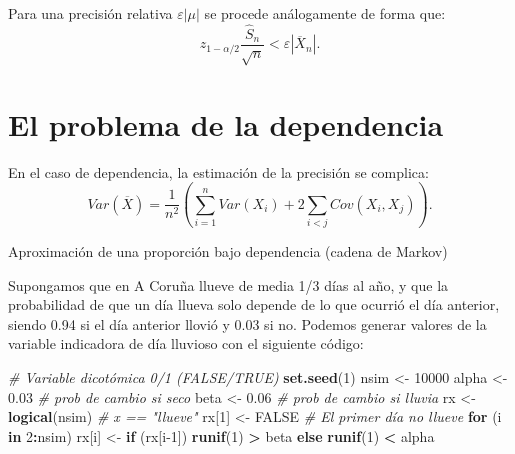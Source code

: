 \documentclass[
]{book}
\newenvironment{Shaded}{\begin{snugshade}}{\end{snugshade}}
\newcommand{\CommentTok}[1]{\textcolor[rgb]{0.56,0.35,0.01}{\textit{#1}}}
\newcommand{\ControlFlowTok}[1]{\textcolor[rgb]{0.13,0.29,0.53}{\textbf{#1}}}
\newcommand{\DecValTok}[1]{\textcolor[rgb]{0.00,0.00,0.81}{#1}}
\newcommand{\FloatTok}[1]{\textcolor[rgb]{0.00,0.00,0.81}{#1}}
\newcommand{\KeywordTok}[1]{\textcolor[rgb]{0.13,0.29,0.53}{\textbf{#1}}}
\newcommand{\NormalTok}[1]{#1}
\newcommand{\OperatorTok}[1]{\textcolor[rgb]{0.81,0.36,0.00}{\textbf{#1}}}
\newcommand{\OtherTok}[1]{\textcolor[rgb]{0.56,0.35,0.01}{#1}}
\newcommand{\StringTok}[1]{\textcolor[rgb]{0.31,0.60,0.02}{#1}}
\theoremstyle{break}
\theoremstyle{definition}
\theoremstyle{definition}
\theoremstyle{definition}
\theoremstyle{remark}
\let\BeginKnitrBlock\begin \let\EndKnitrBlock\end
\begin{document}
Para una precisión relativa \(\varepsilon \left\vert \mu \right\vert\) se procede análogamente de forma que:
\[z_{1-\alpha /2}\dfrac{\widehat{S}_{n}}{\sqrt{n}}<\varepsilon \left\vert 
\overline{X}_{n}\right\vert .\]

\hypertarget{el-problema-de-la-dependencia}{%
\section{El problema de la dependencia}\label{el-problema-de-la-dependencia}}

En el caso de dependencia, la estimación de la precisión se complica:
\[Var\left( \overline{X}\right) =\frac{1}{n^{2}}\left( 
\sum_{i=1}^{n}Var\left( X_{i} \right) + 2\sum_{i<j}Cov\left( X_{i},X_{j}\right) \right).\]

\BeginKnitrBlock{example}
\protect\hypertarget{exm:mmc}{}{\label{exm:mmc} }Aproximación de una proporción bajo dependencia (cadena de Markov)
\EndKnitrBlock{example}

Supongamos que en A Coruña llueve de media 1/3 días al año,
y que la probabilidad de que un día llueva solo depende de lo que ocurrió el día anterior,
siendo 0.94 si el día anterior llovió y 0.03 si no.
Podemos generar valores de la variable indicadora de día lluvioso con el siguiente código:

\begin{Shaded}
\begin{Highlighting}[]
\CommentTok{# Variable dicotómica 0/1 (FALSE/TRUE)  }
\KeywordTok{set.seed}\NormalTok{(}\DecValTok{1}\NormalTok{)}
\NormalTok{nsim <-}\StringTok{ }\DecValTok{10000}
\NormalTok{alpha <-}\StringTok{ }\FloatTok{0.03} \CommentTok{# prob de cambio si seco}
\NormalTok{beta <-}\StringTok{ }\FloatTok{0.06}  \CommentTok{# prob de cambio si lluvia}
\NormalTok{rx <-}\StringTok{ }\KeywordTok{logical}\NormalTok{(nsim) }\CommentTok{# x == "llueve"}
\NormalTok{rx[}\DecValTok{1}\NormalTok{] <-}\StringTok{ }\OtherTok{FALSE} \CommentTok{# El primer día no llueve}
\ControlFlowTok{for}\NormalTok{ (i }\ControlFlowTok{in} \DecValTok{2}\OperatorTok{:}\NormalTok{nsim)}
\NormalTok{  rx[i] <-}\StringTok{ }\ControlFlowTok{if}\NormalTok{ (rx[i}\DecValTok{-1}\NormalTok{]) }\KeywordTok{runif}\NormalTok{(}\DecValTok{1}\NormalTok{) }\OperatorTok{>}\StringTok{ }\NormalTok{beta }\ControlFlowTok{else} \KeywordTok{runif}\NormalTok{(}\DecValTok{1}\NormalTok{) }\OperatorTok{<}\StringTok{ }\NormalTok{alpha}
\end{Highlighting}
\end{Shaded}
\end{document}

